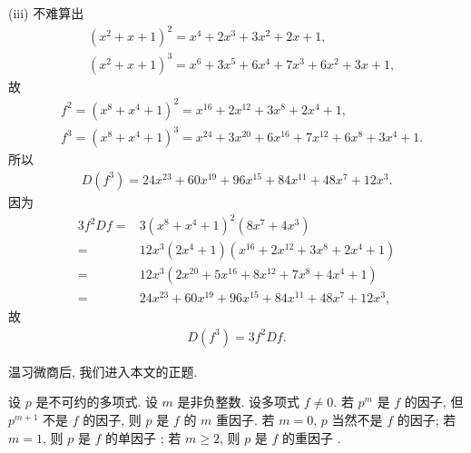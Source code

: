 \begin{example}
    (iii) 不难算出
    \begin{align*}
         & (x^2 + x + 1)^2 = x^4+2 x^3+3 x^2+2 x+1,             \\
         & (x^2 + x + 1)^3 = x^6+3 x^5+6 x^4+7 x^3+6 x^2+3 x+1,
    \end{align*}
    故
    \begin{align*}
         & f^2 = (x^8 + x^4 + 1)^2 = x^{16}+2 x^{12}+3 x^8+2 x^4+1,                   \\
         & f^3 = (x^8 + x^4 + 1)^3 = x^{24}+3 x^{20}+6 x^{16}+7 x^{12}+6 x^8+3 x^4+1.
    \end{align*}
    所以
    \begin{align*}
        D(f^3) = 24 x^{23}+60 x^{19}+96 x^{15}+84 x^{11}+48 x^7+12 x^3.
    \end{align*}
    因为
    \begin{align*}
        3f^2 Df
        = {} & 3(x^8 + x^4 + 1)^2 (8x^7 + 4x^3)                       \\
        = {} & 12 x^3 (2x^4 + 1) (x^{16}+2 x^{12}+3 x^8+2 x^4+1)      \\
        = {} & 12 x^3 (2 x^{20}+5 x^{16}+8 x^{12}+7 x^8+4 x^4+1)      \\
        = {} & 24 x^{23}+60 x^{19}+96 x^{15}+84 x^{11}+48 x^7+12 x^3,
    \end{align*}
    故
    \begin{align*}
        D(f^3) = 3f^2 Df.
    \end{align*}
\end{example}

\myLine

温习微商后, 我们进入本文的正题.

\begin{definition}
    设 $p$ 是不可约的多项式. 设 $m$ 是非负整数. 设多项式 $f \neq 0$. 若 $p^m$ 是 $f$ 的因子, 但 $p^{m+1}$ 不是 $f$ 的因子, 则 $p$ 是 $f$ 的 $m$ 重因子. 若 $m = 0$, $p$ 当然不是 $f$ 的因子; 若 $m = 1$, 则 $p$ 是 $f$ 的单因子 ; 若 $m \geq 2$, 则 $p$ 是 $f$ 的重因子 .
\end{definition}

